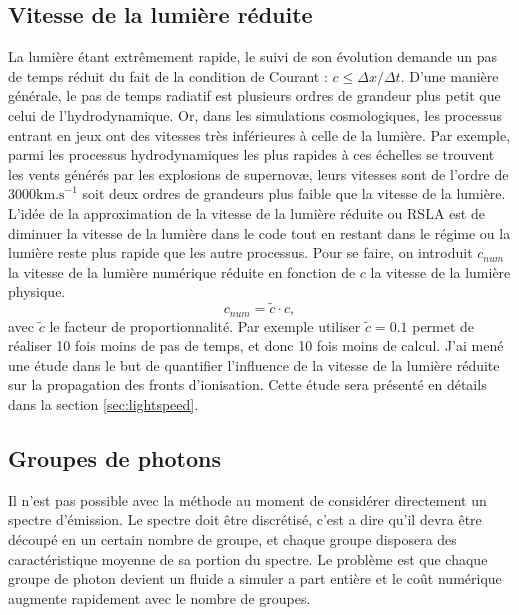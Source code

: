 \subsection{Vitesse de la lumière réduite}
\label{sec:RSLA}

La lumière étant extrêmement rapide, le suivi de son évolution demande un pas de temps réduit du fait de la condition de Courant : $ c \leq \Delta x / \Delta t $.
D'une manière générale, le pas de temps radiatif est plusieurs ordres de grandeur plus petit que celui de l'hydrodynamique.
Or, dans les simulations cosmologiques, les processus entrant en jeux ont des vitesses très inférieures à celle de la lumière.
Par exemple, parmi les processus hydrodynamiques les plus rapides à ces échelles se trouvent les vents générés par les explosions de supernovæ, leurs vitesses sont de l'ordre de $3000 \mathrm{km.s}^{-1}$ soit deux ordres de grandeurs plus faible que la vitesse de la lumière.
L'idée de la approximation de la vitesse de la lumière réduite ou \ac{RSLA} est de diminuer la vitesse de la lumière dans le code tout en restant dans le régime ou la lumière reste plus rapide que les autre processus.
Pour se faire, on introduit $c_{num}$ la vitesse de la lumière numérique réduite en fonction de $c$ la vitesse de la lumière physique.
\begin{equation}
c_{num} = \tilde{c} \cdot{c},
\end{equation}
avec $\tilde{c}$ le facteur de proportionnalité. 
Par exemple utiliser $\tilde{c}=0.1$ permet de réaliser 10 fois moins de pas de temps, et donc 10 fois moins de calcul.
J'ai mené une étude dans le but de quantifier l'influence de la vitesse de la lumière réduite sur la propagation des fronts d'ionisation.
Cette étude sera présenté en détails dans la section \ref{sec:lightspeed}.

\subsection{Groupes de photons}
\label{sec:groupedephotons}

Il n'est pas possible avec la méthode au moment de considérer directement un spectre d'émission.
Le spectre doit être discrétisé, c'est a dire qu'il devra être découpé en un certain nombre de groupe, et chaque groupe disposera des caractéristique moyenne de sa portion du spectre.
Le problème est que chaque groupe de photon devient un fluide a simuler a part entière et le coût numérique augmente rapidement avec le nombre de groupes. 

